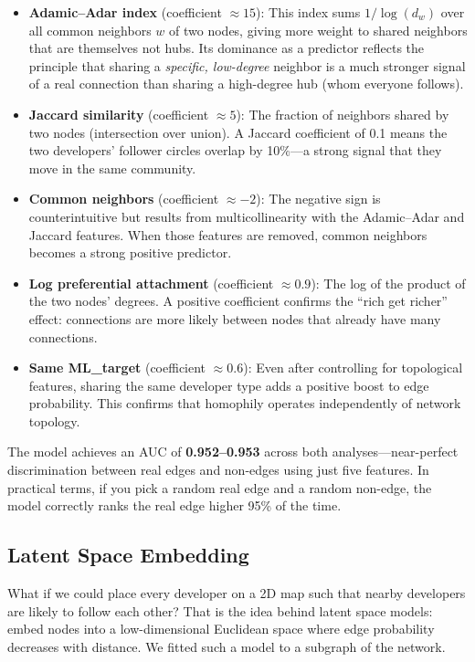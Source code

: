 \documentclass[letterpaper]{article}
\begin{document}
\begin{itemize}
  \item \textbf{Adamic--Adar index} (coefficient $\approx 15$): This index sums $1/\log(d_w)$ over all common neighbors $w$ of two nodes, giving more weight to shared neighbors that are themselves not hubs. Its dominance as a predictor reflects the principle that sharing a \emph{specific, low-degree} neighbor is a much stronger signal of a real connection than sharing a high-degree hub (whom everyone follows).

  \item \textbf{Jaccard similarity} (coefficient $\approx 5$): The fraction of neighbors shared by two nodes (intersection over union). A Jaccard coefficient of 0.1 means the two developers' follower circles overlap by 10\%---a strong signal that they move in the same community.

  \item \textbf{Common neighbors} (coefficient $\approx -2$): The negative sign is counterintuitive but results from multicollinearity with the Adamic--Adar and Jaccard features. When those features are removed, common neighbors becomes a strong positive predictor.

  \item \textbf{Log preferential attachment} (coefficient $\approx 0.9$): The log of the product of the two nodes' degrees. A positive coefficient confirms the ``rich get richer'' effect: connections are more likely between nodes that already have many connections.

  \item \textbf{Same ML\_target} (coefficient $\approx 0.6$): Even after controlling for topological features, sharing the same developer type adds a positive boost to edge probability. This confirms that homophily operates independently of network topology.
\end{itemize}

The model achieves an AUC of \textbf{0.952--0.953} across both analyses---near-perfect discrimination between real edges and non-edges using just five features. In practical terms, if you pick a random real edge and a random non-edge, the model correctly ranks the real edge higher 95\% of the time.

\subsection{Latent Space Embedding}

What if we could place every developer on a 2D map such that nearby developers are likely to follow each other? That is the idea behind latent space models: embed nodes into a low-dimensional Euclidean space where edge probability decreases with distance. We fitted such a model to a subgraph of the network.
\end{document}
